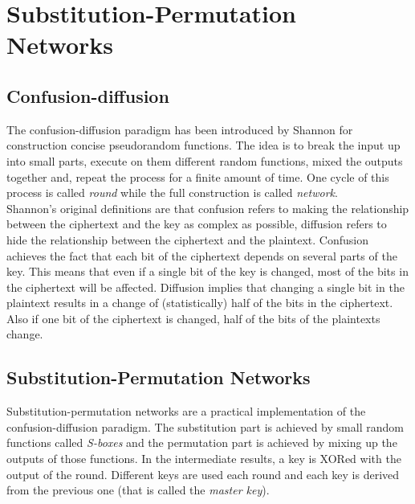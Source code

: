 \section{Substitution-Permutation Networks}
\subsection{Confusion-diffusion}
The confusion-diffusion paradigm has been introduced by Shannon for construction concise pseudorandom functions. The idea is to break the input up into small parts, execute on them different random functions, mixed the outputs together and, repeat the process for a finite amount of time. One cycle of this process is called \emph{round} while the full construction is called \emph{network}.\\
Shannon's original definitions are that confusion refers to making the relationship between the ciphertext and the key as complex as possible, diffusion refers to hide the relationship between the ciphertext and the plaintext.
Confusion achieves the fact that each bit of the ciphertext depends on several parts of the key. This means that even if a single bit of the key is changed, most of the bits in the ciphertext will be affected.
Diffusion implies that changing a single bit in the plaintext results in a change of (statistically) half of the bits in the ciphertext. Also if one bit of the ciphertext is changed, half of the bits of the plaintexts change.

\subsection{Substitution-Permutation Networks}
Substitution-permutation networks are a practical implementation of the confusion-diffusion paradigm. The substitution part is achieved by small random functions called \emph{S-boxes} and the permutation part is achieved by mixing up the outputs of those functions. In the intermediate results, a key is XORed with the output of the round. Different keys are used each round and each key is derived from the previous one (that is called the \emph{master key}).
